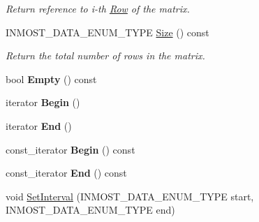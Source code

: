 \begin{DoxyCompactItemize}
\begin{DoxyCompactList}\small\item\em Return reference to i-\/th \hyperlink{classINMOST_1_1Solver_1_1Row}{Row} of the matrix. \end{DoxyCompactList}\item 
\hypertarget{classINMOST_1_1Solver_1_1Matrix_a0313915ca6c5798b14d6babe84588152}{I\-N\-M\-O\-S\-T\-\_\-\-D\-A\-T\-A\-\_\-\-E\-N\-U\-M\-\_\-\-T\-Y\-P\-E \hyperlink{classINMOST_1_1Solver_1_1Matrix_a0313915ca6c5798b14d6babe84588152}{Size} () const }\label{classINMOST_1_1Solver_1_1Matrix_a0313915ca6c5798b14d6babe84588152}

\begin{DoxyCompactList}\small\item\em Return the total number of rows in the matrix. \end{DoxyCompactList}\item 
\hypertarget{classINMOST_1_1Solver_1_1Matrix_aef3151cbca1e3120bb1133c47d3c84b5}{bool {\bfseries Empty} () const }\label{classINMOST_1_1Solver_1_1Matrix_aef3151cbca1e3120bb1133c47d3c84b5}

\item 
\hypertarget{classINMOST_1_1Solver_1_1Matrix_a0bc37578c2eddf013f679ca87fb450ac}{iterator {\bfseries Begin} ()}\label{classINMOST_1_1Solver_1_1Matrix_a0bc37578c2eddf013f679ca87fb450ac}

\item 
\hypertarget{classINMOST_1_1Solver_1_1Matrix_af0c4430867adb5b7783ed563fb5e55a5}{iterator {\bfseries End} ()}\label{classINMOST_1_1Solver_1_1Matrix_af0c4430867adb5b7783ed563fb5e55a5}

\item 
\hypertarget{classINMOST_1_1Solver_1_1Matrix_ac6ad98577f78e8e7574aa527df230b49}{const\-\_\-iterator {\bfseries Begin} () const }\label{classINMOST_1_1Solver_1_1Matrix_ac6ad98577f78e8e7574aa527df230b49}

\item 
\hypertarget{classINMOST_1_1Solver_1_1Matrix_a18ddeeb964fc61afe63f44a5a71360a5}{const\-\_\-iterator {\bfseries End} () const }\label{classINMOST_1_1Solver_1_1Matrix_a18ddeeb964fc61afe63f44a5a71360a5}

\item 
\hypertarget{classINMOST_1_1Solver_1_1Matrix_ab9c48b8ca91c452030d291678a855fad}{void \hyperlink{classINMOST_1_1Solver_1_1Matrix_ab9c48b8ca91c452030d291678a855fad}{Set\-Interval} (I\-N\-M\-O\-S\-T\-\_\-\-D\-A\-T\-A\-\_\-\-E\-N\-U\-M\-\_\-\-T\-Y\-P\-E start, I\-N\-M\-O\-S\-T\-\_\-\-D\-A\-T\-A\-\_\-\-E\-N\-U\-M\-\_\-\-T\-Y\-P\-E end)}\label{classINMOST_1_1Solver_1_1Matrix_ab9c48b8ca91c452030d291678a855fad}


\end{DoxyCompactItemize}
